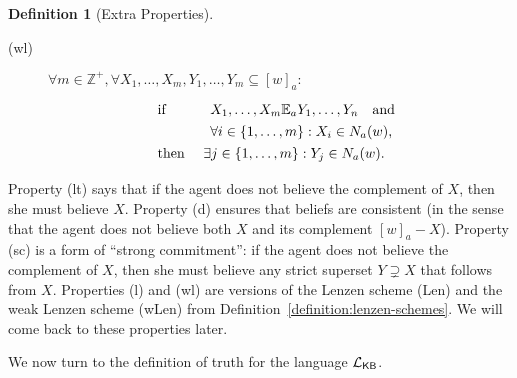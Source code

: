 \documentclass[12pt]{article}
\theoremstyle{definition}
\newtheorem{definition}[theorem]{Definition}
\newcommand{\Int}{\mathbb{Z}}  %
\newcommand{\Lang}{{\cal L}}   %
\newcommand{\KB}{{\mathsf{KB}}}                     %
\begin{document}
\begin{definition}[Extra Properties]
\begin{description}
  \item[(wl)] $\forall m\in\Int^+,\forall
    X_1,\dots,X_m,Y_1,\dots,Y_m\subseteq[w]_a:$
    \[
    \renewcommand{\arraystretch}{1.3}
    \begin{array}{ll}
      \text{if }
      &
      \begin{array}[t]{l}
        X_1,\dots,X_m\mathbb{E}_aY_1,\dots,Y_n \quad\text{and}
        \\
        \forall i\in\{1,\dots,m\}:
        X_i\in N_a(w) \text{,}
      \end{array}
      \\
      \text{then }
      &
      \exists j\in\{1,\dots,m\}: Y_j\in N_a(w)\text{.}
    \end{array}
    \]
  \end{description}
\end{definition}

Property (lt) says that if the agent does not believe the complement
of $X$, then she must believe $X$.  Property (d) ensures that beliefs
are consistent (in the sense that the agent does not believe both $X$
and its complement $[w]_a-X$). Property (sc) is a form of ``strong
commitment'': if the agent does not believe the complement of $X$,
then she must believe any strict superset $Y\supsetneq X$ that follows
from $X$.  Properties (l) and (wl) are versions of the Lenzen scheme
(Len) and the weak Lenzen scheme (wLen) from
Definition~\ref{definition:lenzen-schemes}.  We will come back to
these properties later.

We now turn to the definition of truth for the language $\Lang_\KB$.
\end{document}
